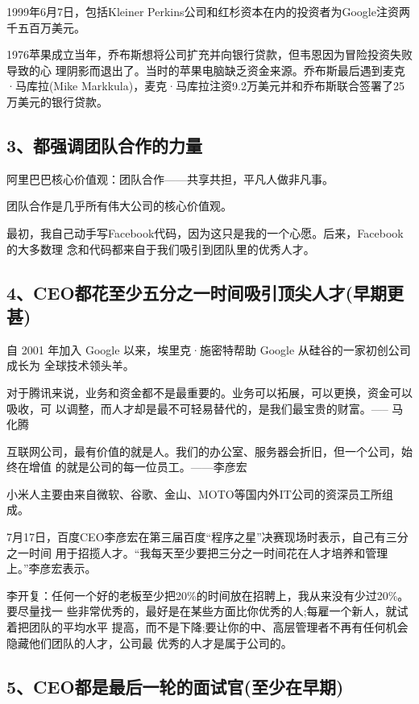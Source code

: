 \documentclass[11pt]{ctexart}
\begin{document}
{{{{1999年6月7日，包括Kleiner Perkins公司和红杉资本在内的投资者为Google注资两千五百万美元。

1976苹果成立当年，乔布斯想将公司扩充并向银行贷款，但韦恩因为冒险投资失败导致的心
理阴影而退出了。当时的苹果电脑缺乏资金来源。乔布斯最后遇到麦克·马库拉(Mike
Markkula)，麦克·马库拉注资9.2万美元并和乔布斯联合签署了25万美元的银行贷款。

\subsection{3、都强调团队合作的力量}
\label{sec:org69a0bc0}

阿里巴巴核心价值观：团队合作——共享共担，平凡人做非凡事。

团队合作是几乎所有伟大公司的核心价值观。

最初，我自己动手写Facebook代码，因为这只是我的一个心愿。后来，Facebook的大多数理
念和代码都来自于我们吸引到团队里的优秀人才。

\subsection{4、CEO都花至少五分之一时间吸引顶尖人才(早期更甚)}
\label{sec:org8905c29}

自 2001 年加入 Google 以来，埃里克·施密特帮助 Google 从硅谷的一家初创公司成长为
全球技术领头羊。

对于腾讯来说，业务和资金都不是最重要的。业务可以拓展，可以更换，资金可以吸收，可
以调整，而人才却是最不可轻易替代的，是我们最宝贵的财富。----- 马化腾

互联网公司，最有价值的就是人。我们的办公室、服务器会折旧，但一个公司，始终在增值
的就是公司的每一位员工。——李彦宏

小米人主要由来自微软、谷歌、金山、MOTO等国内外IT公司的资深员工所组成。

7月17日，百度CEO李彦宏在第三届百度“程序之星”决赛现场时表示，自己有三分之一时间
用于招揽人才。“我每天至少要把三分之一时间花在人才培养和管理上。”李彦宏表示。

李开复：任何一个好的老板至少把20\%的时间放在招聘上，我从来没有少过20\%。要尽量找一
些非常优秀的，最好是在某些方面比你优秀的人;每雇一个新人，就试着把团队的平均水平
提高，而不是下降;要让你的中、高层管理者不再有任何机会隐藏他们团队的人才，公司最
优秀的人才是属于公司的。

\subsection{5、CEO都是最后一轮的面试官(至少在早期)}
\label{sec:org94b38d2}

}}}}
\end{document}
